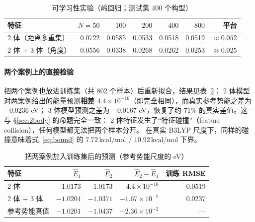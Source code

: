 \documentclass[UTF8,a4paper,11pt]{ctexart}
\newcommand{\kcal}{\,\mathrm{kcal/mol}}
\begin{document}
\begin{table}[H]
\centering\small
\caption{可学习性实验（岭回归；测试集 400 个构型）}
\label{tab:learn}
\begin{tabular}{@{}lrrrrrr@{}}
\toprule
特征 & $N=50$ & $100$ & $200$ & $400$ & $800$ & 平台\\
\midrule
2 体（距离多重集） & 0.0722 & 0.0585 & 0.0533 & 0.0518 & 0.0519 & $\approx0.052$\\
2 体 + 3 体（角度） & 0.0556 & 0.0338 & 0.0268 & 0.0262 & 0.0253 & $\approx0.025$\\
\bottomrule
\end{tabular}
\end{table}

\paragraph{两个案例上的直接检验}
把两个案例也放进训练集（共 802 个样本）后重新拟合，结果见表~\ref{tab:predict}：
2 体模型对两案例给出的能量预测\textbf{相差 $4.4\times10^{-16}$}（即完全相同），而真实参考势能之差为 $-0.0236$ eV；
3 体模型预测之差为 $-0.0167$ eV，恢复了约 $71\%$ 的真实差值。这与 \S\ref{sec:2body} 的命题完全一致：
2 体特征发生了“特征碰撞”（feature collision），任何模型都无法把两个样本分开。
在真实 B3LYP 尺度下，同样的碰撞意味着式~\eqref{eq:bound} 的 $7.72\kcal$ / $10.92\kcal$ 下界。

\begin{table}[H]
\centering\small
\caption{把两案例加入训练集后的预测（参考势能尺度的 eV）}
\label{tab:predict}
\begin{tabular}{@{}lrrrr@{}}
\toprule
特征 & $\hat E_1$ & $\hat E_2$ & $\hat E_2-\hat E_1$ & 训练 RMSE\\
\midrule
2 体 & $-1.0173$ & $-1.0173$ & $-4.4\times10^{-16}$ & 0.0519\\
2 体 + 3 体 & $-1.0204$ & $-1.0371$ & $-1.67\times10^{-2}$ & 0.0237\\
\midrule
参考势能真值 & $-1.0201$ & $-1.0437$ & $-2.36\times10^{-2}$ & ---\\
\bottomrule
\end{tabular}
\end{table}
\end{document}

